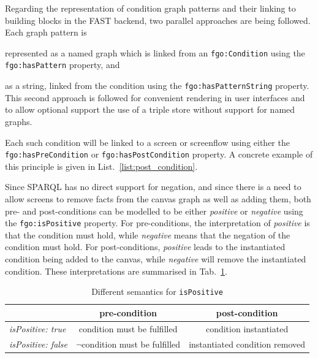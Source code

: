 \documentclass[twoside]{fast_latex}
\begin{document}
Regarding the representation of condition graph patterns and their linking to building blocks in the FAST backend, two parallel approaches are being followed. Each graph pattern is 
\begin{inparaenum}[(i)]
	\item represented as a named graph which is linked from an \texttt{fgo:Condition} using the \texttt{fgo:hasPattern} property, and
	\item as a string, linked from the condition using the \texttt{fgo:hasPatternString} property. This second approach is followed for convenient rendering in user interfaces and to allow optional support the use of a triple store without support for named graphs.
\end{inparaenum}
Each such condition will be linked to a screen or screenflow using either the \texttt{fgo:has\-PreCondition} or \texttt{fgo:has\-Post\-Condition} property. A concrete example of this principle is given in List.~\ref{list:post_condition}.

\singlespacing
{}
\begin{figure}
	
\end{figure}
\doublespacing


Since SPARQL has no direct support for negation, and since there is a need to allow screens to remove facts from the canvas graph as well as adding them, both pre- and post-conditions can be modelled to be either \emph{positive} or \emph{negative} using the \texttt{fgo:isPositive} property. For pre-conditions, the interpretation of \emph{positive} is that the condition must hold, while \emph{negative} means that the negation of the condition must hold. For post-conditions, \emph{positive} leads to the instantiated condition being added to the canvas, while \emph{negative} will remove the instantiated condition. These interpretations are summarised in Tab.~\ref{tab:is_positive}.

\begin{table}[ht]
	\caption{Different semantics for \texttt{isPositive}}
	\label{tab:is_positive}
	\begin{center}
		
		\begin{tabular}{lcc}
			\toprule
			& \textbf{pre-condition} & \textbf{post-condition} \\ 
			\midrule
			\emph{isPositive: true} & condition must be fulfilled & condition instantiated\\ 
			\emph{isPositive: false} & $\neg$condition must be fulfilled & instantiated condition removed \\ 
			\bottomrule
		\end{tabular}
	\end{center}
\end{table}
\end{document}
